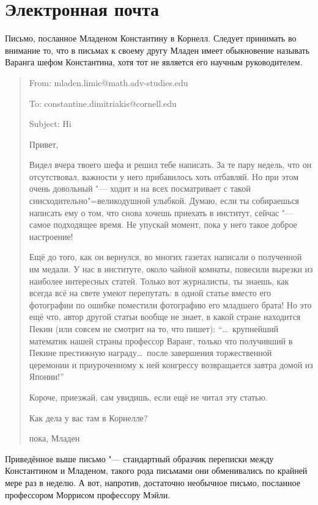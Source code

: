 \section{Электронная почта}

Письмо, посланное Младеном Константину в Корнелл.
Следует принимать во внимание то, что в письмах к своему другу Младен имеет
обыкновение называть Варанга шефом Константина, хотя тот не является его научным
руководителем.

\begin{quote}
From: mladen.limic@math.adv-studies.edu

To: constantine.dimitriakis@cornell.edu

Subject: Hi

\medskip
Привет,

Видел вчера твоего шефа и решил тебе написать.
За те пару недель, что он отсутствовал, важности у него прибавилось хоть
отбавляй.
Но при этом очень довольный "--- ходит и на всех посматривает с такой
снисходительно"=великодушной улыбкой.
Думаю, если ты собираешься написать ему о том, что снова хочешь приехать в
институт, сейчас "--- самое подходящее время.
Не упускай момент, пока у него такое доброе настроение!

Ещё до того, как он вернулся, во многих газетах написали о полученной им медали.
У нас в институте, около чайной комнаты, повесили вырезки из наиболее интересных
статей.
Только вот журналисты, ты знаешь, как всегда всё на свете умеют перепутать: в
одной статье вместо его фотографии по ошибке поместили фотографию его младшего
брата!
Но это ещё что, автор другой статьи вообще не знает, в какой стране находится
Пекин (или совсем не смотрит на то, что пишет):
\enquote{\ldots\ крупнейший математик нашей страны профессор Варанг, только что
получивший в Пекине престижную награду\ldots\ после завершения торжественной
церемонии и приуроченному к ней конгрессу возвращается завтра домой из Японии!}

Короче, приезжай, сам увидишь, если ещё не читал эту статью.

Как дела у вас там в Корнелле?

пока, Младен
\end{quote}

Приведённое выше письмо "--- стандартный образчик переписки между Константином и
Младеном, такого рода письмами они обменивались по крайней мере раз в неделю.
А вот, напротив, достаточно необычное письмо, посланное профессором Моррисом
профессору Мэйли.

